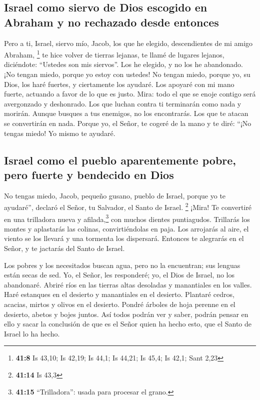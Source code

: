 \hypertarget{israel-como-siervo-de-dios-escogido-en-abraham-y-no-rechazado-desde-entonces}{%
\subsection{Israel como siervo de Dios escogido en Abraham y no
rechazado desde
entonces}\label{israel-como-siervo-de-dios-escogido-en-abraham-y-no-rechazado-desde-entonces}}

 Pero a ti, Israel, siervo mío, Jacob, los que he elegido,
descendientes de mi amigo Abraham, \footnote{\textbf{41:8} Is 43,10; Is
  42,19; Is 44,1; Is 44,21; Is 45,4; Is 42,1; Sant 2,23} 
te hice volver de tierras lejanas, te llamé de lugares lejanos,
diciéndote: ``Ustedes son mis siervos''. Los he elegido, y no los he
abandonado.  ¡No tengan miedo, porque yo estoy con
ustedes! No tengan miedo, porque yo, su Dios, los haré fuertes, y
ciertamente los ayudaré. Los apoyaré con mi mano fuerte, actuando a
favor de lo que es justo.  Mira: todo el que se enoje
contigo será avergonzado y deshonrado. Los que luchan contra ti
terminarán como nada y morirán.  Aunque busques a tus
enemigos, no los encontrarás. Los que te atacan se convertirán en nada.
 Porque yo, el Señor, te cogeré de la mano y te diré:
``¡No tengas miedo! Yo mismo te ayudaré.

\hypertarget{israel-como-el-pueblo-aparentemente-pobre-pero-fuerte-y-bendecido-en-dios}{%
\subsection{Israel como el pueblo aparentemente pobre, pero fuerte y
bendecido en
Dios}\label{israel-como-el-pueblo-aparentemente-pobre-pero-fuerte-y-bendecido-en-dios}}

 No tengas miedo, Jacob, pequeño gusano, pueblo de
Israel, porque yo te ayudaré'', declaró el Señor, tu Salvador, el Santo
de Israel. \footnote{\textbf{41:14} Is 43,3}  ¡Mira! Te
convertiré en una trilladora nueva y afilada,\footnote{\textbf{41:15}
  ``Trilladora'': usada para procesar el grano.} con muchos dientes
puntiagudos. Trillarás los montes y aplastarás las colinas,
convirtiéndolas en paja.  Los arrojarás al aire, el
viento se los llevará y una tormenta los dispersará. Entonces te
alegrarás en el Señor, y te jactarás del Santo de Israel.

 Los pobres y los necesitados buscan agua, pero no la
encuentran; sus lenguas están secas de sed. Yo, el Señor, les
responderé; yo, el Dios de Israel, no los abandonaré. 
Abriré ríos en las tierras altas desoladas y manantiales en los valles.
Haré estanques en el desierto y manantiales en el desierto.
 Plantaré cedros, acacias, mirtos y olivos en el
desierto. Pondré árboles de hoja perenne en el desierto, abetos y bojes
juntos.  Así todos podrán ver y saber, podrán pensar en
ello y sacar la conclusión de que es el Señor quien ha hecho esto, que
el Santo de Israel lo ha hecho.

